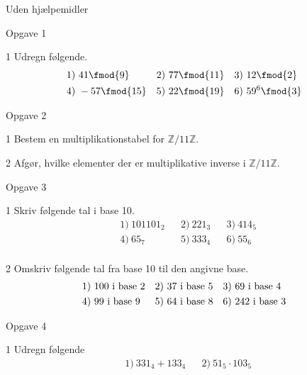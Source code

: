 \begin{center}
	\Large
	Uden hjælpemidler	
\end{center}
%
%
%
%
%
\begin{opgavetekst}{Opgave 1}
\end{opgavetekst}
%
%
\begin{delopgave}{1}
	Udregn følgende.
	\begin{align*}
		&1) \ 41 \fmod{9}   &&2) \ 77 \fmod{11}   &&3) \ 12 \fmod{2}   \\
		&4) \ -57 \fmod{15}   &&5) \ 22 \fmod{19}   &&6) \ 59^{6} \fmod{3}   \\
	\end{align*}
\end{delopgave}
%
%
%
%
%
\begin{opgavetekst}{Opgave 2}
\end{opgavetekst}
%
%
\begin{delopgave}{1}
	Bestem en multiplikationstabel for $\mathbb{Z}/11\mathbb{Z}$. 
\end{delopgave}
%
%
\begin{delopgave}{2}
	Afgør, hvilke elementer der er multiplikative inverse i $\mathbb{Z}/11\mathbb{Z}$. 
\end{delopgave}
%
%
%
%
%
\begin{opgavetekst}{Opgave 3}
\end{opgavetekst}
\begin{delopgave}{1}
	Skriv følgende tal i base 10.
	\begin{align*}
		&1) \ 101101_2   &&2) \ 221_3   &&3) \ 414_5    \\
		&4) \ 65_7   &&5) \ 333_4    &&6) \ 55_6   \\
	\end{align*}
\end{delopgave}
\begin{delopgave}{2}
	Omskriv følgende tal fra base 10 til den angivne base.
	\begin{align*}
		&1) \ 100\textnormal{ i base 2}   &&2) \ 37\textnormal{ i base 5}   &&3) \ 69\textnormal{ i base 4}    \\
		&4) \ 99\textnormal{ i base 9}   &&5) \ 64\textnormal{ i base 8}    &&6) \ 242\textnormal{ i base 3}   \\
	\end{align*}	 
\end{delopgave}
%
%
%
%
%
\begin{opgavetekst}{Opgave 4}
\end{opgavetekst}
\begin{delopgave}{1}
	Udregn følgende
	\begin{align*}
		&1) \ 331_4 + 133_4 &&2) \ 51_5\cdot 103_5
	\end{align*}
\end{delopgave}
